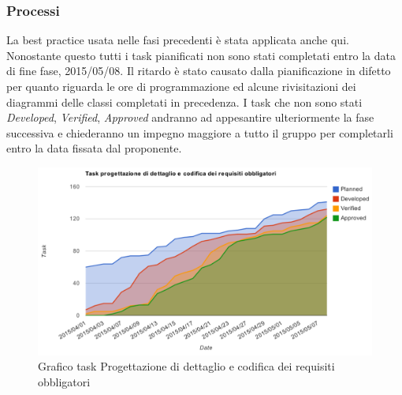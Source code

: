 		\subsubsection{Processi}
		La best practice usata nelle fasi precedenti è stata applicata anche qui. Nonostante questo tutti i task pianificati non sono stati completati entro la data di fine fase, 2015/05/08. Il ritardo è stato causato dalla pianificazione in difetto per quanto riguarda le ore di programmazione ed alcune rivisitazioni dei diagrammi delle classi completati in precedenza. I task che non sono stati \textit{Developed}, \textit{Verified}, \textit{Approved} andranno ad appesantire ulteriormente la fase successiva e chiederanno un impegno maggiore a tutto il gruppo per completarli entro la data fissata dal proponente.		
			\begin{figure}[htbp]
				\centering
				\centerline{\includegraphics[scale=0.6]{images/Grafico_fase_5.pdf}}
				\caption{Grafico task Progettazione di dettaglio e codifica dei requisiti obbligatori}
				\label{fig:taskfase5}
			\end{figure}
			
